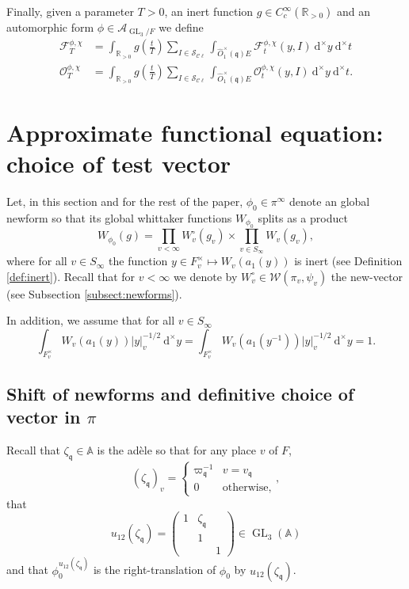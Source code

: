 \documentclass[a4paper,11pt]{amsart}
\theoremstyle{definition}
\newcommand{\A}{\mathbb{A}}
\newcommand{\R}{\mathbb{R}}
\newcommand{\gelle}{\operatorname{GL}}
\newcommand{\cl}{\mathcal{C}\ell}
\begin{document}
Finally, given a parameter $T>0$, an inert function $g\in C_c^{\infty}(\R_{>0})$ and an automorphic form $\phi \in \mathcal{A}_{\gelle_3/F}$ we define 
\begin{align*}\mathcal{F}^{\phi,\chi}_T &= \int_{\R_{>0}}g\left(\frac{t}{T}\right) \sum_{I\in \mathcal{S}_{\cl}}\int_{\widehat{O}_1^{\times}(\mathfrak{q})E}\mathcal{F}_t^{\phi,\chi}(y,I)\ \mathrm{d}^{\times}y\ \mathrm{d}^{\times}t\\
\mathcal{O}_T^{\phi,\chi}&=\int_{\R_{>0}}g\left(\frac{t}{T}\right) \sum_{I\in \mathcal{S}_{\cl}}\int_{\widehat{O}_1^{\times}(\mathfrak{q})E}\mathcal{O}_t^{\phi,\chi}(y,I)\ \mathrm{d}^{\times}y\ \mathrm{d}^{\times}t.
\end{align*}













\section{Approximate functional equation: choice of test vector}\label{sec:approximatefunctionalequation}
Let, in this section and for the rest of the paper, $\phi_0 \in \pi^{\infty}$ denote an global newform so that its global whittaker functions $W_{\phi_0}$ splits as a product $$W_{\phi_0}(g) = \prod_{v<\infty}W^{\circ}_{v}(g_v) \times \prod_{v\in S_{\infty}}W_v(g_v),$$ where for all $v\in S_{\infty}$ the function $y\in F_v^{\times}\mapsto W_v(a_1(y))$ is inert (see Definition \ref{def:inert}). Recall that for $v<\infty$ we denote by $W^{\circ}_v \in \mathcal{W}(\pi_v,\psi_v)$ the new-vector (see Subsection \ref{subsect:newforms}).  

In addition, we assume that for all $v\in S_\infty$ \begin{equation}\label{eq:assumption-on-archimdean}
    \int_{F_v^\times}W_v(a_1(y))\vert y \vert_v^{-1/2}\ \mathrm{d}^\times y = \int_{F_v^\times}W_v(a_1(y^{-1}))\vert y\vert_v^{-1/2}\ \mathrm{d}^\times y = 1. 
\end{equation} 




\subsection{Shift of newforms and definitive choice of vector in $\pi$}\label{subsect:snca}
Recall that $\zeta_\mathfrak{q}\in \A$ is the adèle so that for any place $v$ of $F$, $$(\zeta_\mathfrak{q})_v=\begin{cases}
    \varpi_\mathfrak{q}^{-1}& v=v_\mathfrak{q}\\0&\text{otherwise},
\end{cases},$$
that $$u_{12}(\zeta_\mathfrak{q}) = \begin{pmatrix}
    1&\zeta_\mathfrak{q}&\\&1&\\&&1
\end{pmatrix}\in \gelle_3(\A)$$
and that $\phi_0^{u_{12}(\zeta_\mathfrak{q})}$ is the right-translation of $\phi_0$ by $u_{12}(\zeta_\mathfrak{q})$.
\end{document}
